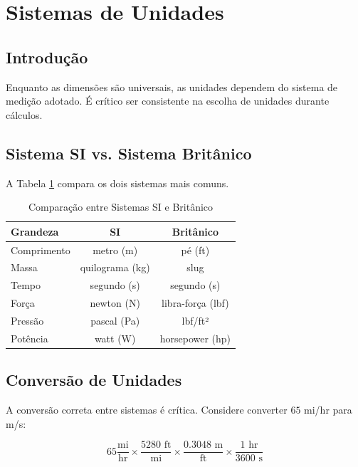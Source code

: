 \documentclass[12pt,a4paper,oneside]{book}
\theoremstyle{definition}
\begin{document}
\section{Sistemas de Unidades}

\subsection{Introdução}

Enquanto as dimensões são universais, as unidades dependem do sistema de medição adotado. É crítico ser consistente na escolha de unidades durante cálculos.

\subsection{Sistema SI vs. Sistema Britânico}

A Tabela \ref{tab:units} compara os dois sistemas mais comuns.

\begin{table}[h]
\centering
\caption{Comparação entre Sistemas SI e Britânico}
\label{tab:units}
\begin{tabular}{lcc}
\toprule
\textbf{Grandeza} & \textbf{SI} & \textbf{Britânico} \\
\midrule
Comprimento & metro (m) & pé (ft) \\
Massa & quilograma (kg) & slug \\
Tempo & segundo (s) & segundo (s) \\
Força & newton (N) & libra-força (lbf) \\
Pressão & pascal (Pa) & lbf/ft² \\
Potência & watt (W) & horsepower (hp) \\
\bottomrule
\end{tabular}
\end{table}

\subsection{Conversão de Unidades}

A conversão correta entre sistemas é crítica. Considere converter $65$ mi/hr para m/s:

\begin{equation}
65 \frac{\text{mi}}{\text{hr}} \times \frac{5280 \text{ ft}}{\text{mi}} \times \frac{0.3048 \text{ m}}{\text{ft}} \times \frac{1 \text{ hr}}{3600 \text{ s}}
\end{equation}
\end{document}
